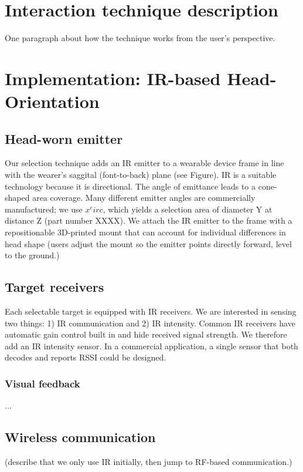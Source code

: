
\section{Interaction technique description}
One paragraph about how the technique works from the user's perspective.
\section{Implementation: IR-based Head-Orientation}
\subsection{Head-worn emitter}
Our selection technique adds an IR emitter to a wearable device frame in line with the wearer's saggital (font-to-back) plane (see Figure). IR is a suitable technology because it is directional. The angle of emittance leads to a cone-shaped area coverage. Many different emitter angles are commercially manufactured; we use $x^circ$, which yields a selection area of diameter Y at distance Z (part number XXXX).
We attach the IR emitter to the frame with a repositionable 3D-printed mount that can account for individual differences in head shape (users adjust the mount so the emitter points directly forward, level to the ground.)

\subsection{Target receivers}
Each selectable target is equipped with IR receivers. We are interested in sensing two things: 1) IR communication and 2) IR intensity. Common IR receivers have automatic gain control built in and hide received signal strength. We therefore add an IR intensity sensor. In a commercial application, a single sensor that both decodes and reports RSSI could be designed.
\subsubsection{Visual feedback}
...
\subsection{Wireless communication}
(describe that we only use IR initially, then jump to RF-based communication.)

